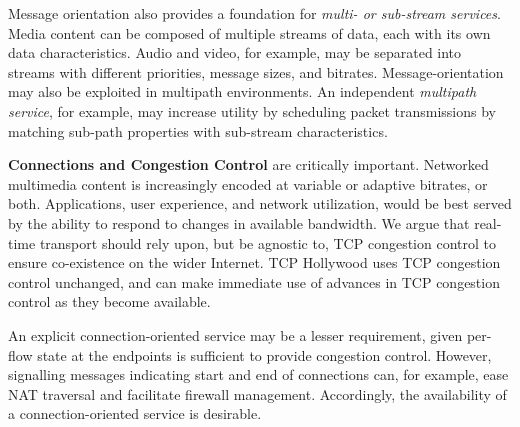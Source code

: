 Message orientation also provides a foundation for {\em multi- or sub-stream services}. Media content can be composed of multiple streams of data, each with its own data characteristics. Audio and video, for example, may be separated into streams with different priorities, message sizes, and bitrates. Message-orientation may also be exploited in multipath environments. An independent {\em multipath service}, for example, may increase utility by scheduling packet transmissions by matching sub-path properties with sub-stream characteristics.

%
%


\textbf{Connections and Congestion Control} are critically important.
Networked multimedia content is increasingly encoded at variable or
adaptive bitrates, or both. Applications, user experience, and network
utilization, would be best served by the ability to respond to changes in
available bandwidth. We argue that real-time transport should rely upon,
but be agnostic to, TCP congestion control to ensure co-existence on the
wider Internet. TCP Hollywood uses TCP congestion control unchanged, and
can make immediate use of advances in TCP congestion control as they
become available.

An explicit connection-oriented service may be a lesser requirement, given
per-flow state at the endpoints is sufficient to provide 
congestion control. However, signalling messages indicating
start and end of connections can, for example, ease NAT traversal and
facilitate firewall management. Accordingly, the availability of a
connection-oriented service is desirable.

